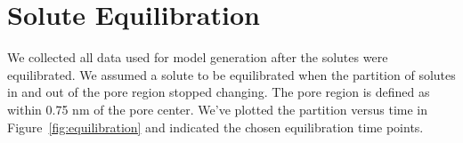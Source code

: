 \documentclass{article}
\begin{document}
  \newpage
  
  \section{Solute Equilibration}\label{section:equilibration}
  
  We collected all data used for model generation after the solutes were 
  equilibrated. We assumed a solute to be equilibrated when the partition of
  solutes in and out of the pore region stopped changing. The pore region is
  defined as within 0.75 nm of the pore center. We've plotted the partition
  versus time in Figure~\ref{fig:equilibration} and indicated the chosen
  equilibration time points. 
  
  
\end{document}
